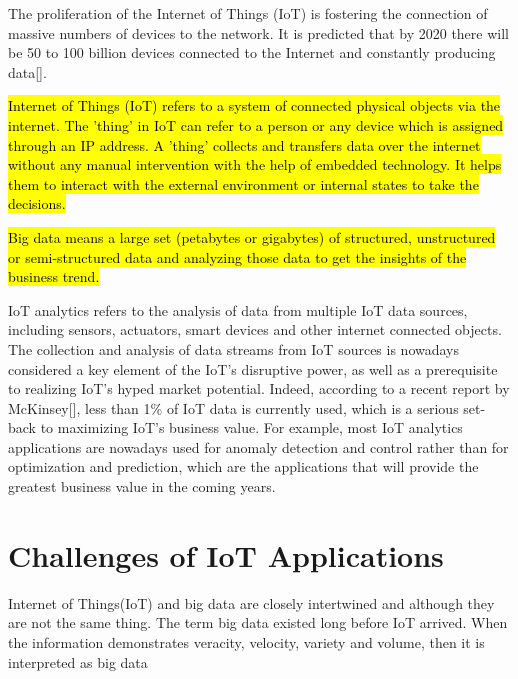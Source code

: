 The proliferation of the Internet of Things (IoT) is fostering the connection of massive numbers of devices to the network. It is predicted that by 2020 there will be 50 to 100 billion devices connected to the Internet and constantly producing data[].

\hl{Internet of Things (IoT) refers to a system of connected physical objects via the internet. The 'thing' in IoT can refer to a person or any device which is assigned through an IP address. A 'thing' collects and transfers data over the internet without any manual intervention with the help of embedded technology. It helps them to interact with the external environment or internal states to take the decisions.}

\hl{Big data means a large set (petabytes or gigabytes) of structured, unstructured or semi-structured data and analyzing those data to get the insights of the business trend.}

IoT analytics refers to the analysis of data from multiple IoT data sources, including sensors, actuators, smart devices and other internet connected objects. The collection and analysis of data streams from IoT sources is nowadays considered a key element of the IoT’s disruptive power, as well as a prerequisite to realizing IoT’s hyped market potential. Indeed, according to a recent report by McKinsey[], less than 1\% of IoT data is currently used, which is a serious set-back to maximizing IoT’s business value. For example, most IoT analytics applications are nowadays used for anomaly detection and control rather than for optimization and prediction, which are the applications that will provide the greatest business value in the coming years.

\section{Challenges of IoT Applications}

Internet of Things(IoT) and big data are closely intertwined and although they are not the same thing.
The term big data existed long before IoT arrived. When the information demonstrates veracity, velocity, variety and volume, then it is interpreted as big data

